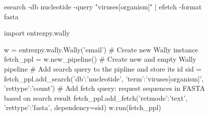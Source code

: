 \documentclass[preview, border=0]{standalone}
\begin{document}
  \begin{figure}




\begin{lrbox}{\mylistingbox}%
    \begin{minipage}{\linewidth}%
      \begin{bash}[xleftmargin=3mm, numbers=none]
esearch -db nucleotide -query "viruses[organism]"  | efetch -format fasta
\end{bash}%
    \end{minipage}%
  \end{lrbox}%

\begin{lrbox}{\mylistingbox}%
    \begin{minipage}{\linewidth}%
      \begin{python}[xleftmargin=3mm]
import entrezpy.wally

w = entrezpy.wally.Wally('email') # Create new Wally instance
fetch_ppl = w.new_pipeline()      # Create new and empty Wally pipeline
# Add search query to the pipline and store its id
sid = fetch_ppl.add_search({'db':'nucleotide',
                            'term':'viruses[organism]',
                            'rettype':'count'})
# Add fetch query: request sequences in FASTA based on search result
fetch_ppl.add_fetch({'retmode':'text', 'rettype':'fasta'}, dependency=sid)
w.run(fetch_ppl)
\end{python}%
    \end{minipage}%
  \end{lrbox}%
  \end{figure}
\end{document}
